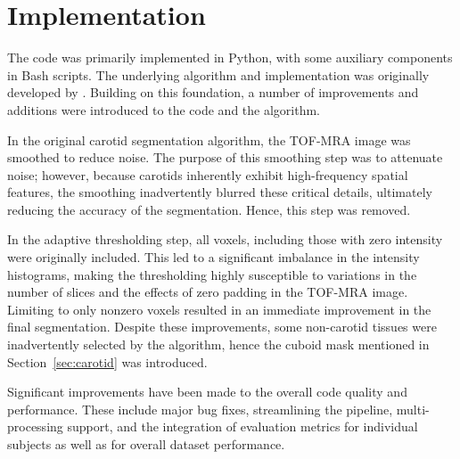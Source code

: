 \section{Implementation}
The code was primarily implemented in Python, with some auxiliary components in Bash scripts.
The underlying algorithm and implementation was originally developed by \citeauthor{irace2021bayesian} \cite{irace2021bayesian}. Building on this foundation, a number of improvements and additions were introduced to the code and the algorithm.

In the original carotid segmentation algorithm, the TOF-MRA image was smoothed to reduce noise.
The purpose of this smoothing step was to attenuate noise; however, because carotids inherently exhibit high-frequency spatial features, the smoothing inadvertently blurred these critical details, ultimately reducing the accuracy of the segmentation.
Hence, this step was removed.

In the adaptive thresholding step, all voxels, including those with zero intensity were originally included.
This led to a significant imbalance in the intensity histograms, making the thresholding highly susceptible to variations in the number of slices and the effects of zero padding in the TOF-MRA image.
Limiting to only nonzero voxels resulted in an immediate improvement in the final segmentation.
Despite these improvements, some non-carotid tissues were inadvertently selected by the algorithm, hence the cuboid mask mentioned in Section~\ref{sec:carotid} was introduced.

Significant improvements have been made to the overall code quality and performance.
These include major bug fixes, streamlining the pipeline, multi-processing support,
and the integration of evaluation metrics for individual subjects as well as for overall dataset performance.

